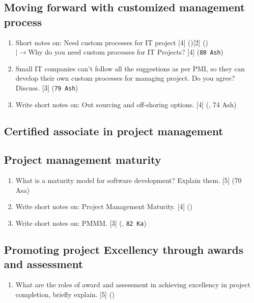 \documentclass[12pt]{article}
\newcommand{\lb}{\\$\left|\rightarrow\right.$}
\begin{document}
  \subsection{Moving forward with customized management process}
    \begin{enumerate}
      \item Short notes on: Need custom processes for IT project \hfill [4] ()[2] ()
        \lb Why do you need custom processes for IT Projects? \hfill [4] (\texttt{80 Ash})

        \item Small IT companies can't follow all the suggestions as per PMI, so they can develop their own custom processes for managing project. Do you agree? Discuss. \hfill [3] (\texttt{79 Ash})

        \item Write short notes on: Out sourcing and off-shoring options. \hfill [4] (, 74 Ash)
    \end{enumerate}

  \subsection{Certified associate in project management}
  \subsection{Project management maturity}
    \begin{enumerate}
      \item What is a maturity model for software development? Explain them. \hfill [5] (70 Asa)

      \item Write short notes on: Project Management Maturity. \hfill [4] ()

      \item Write short notes on: PMMM. \hfill [3] (, \texttt{82 Ka})
    \end{enumerate}

  \subsection{Promoting project Excellency through awards and assessment}
    \begin{enumerate}
      \item What are the roles of award and assessment in achieving excellency in project completion, briefly explain. \hfill [5] ()
    \end{enumerate}
\end{document}
